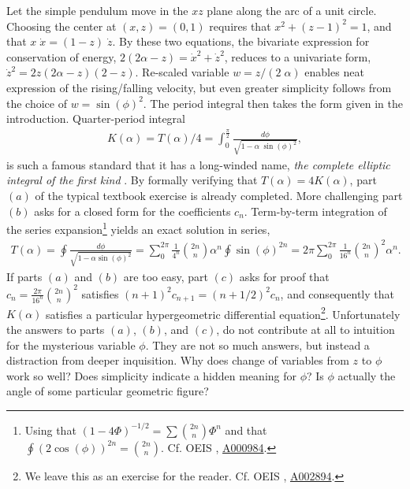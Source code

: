 \documentclass[nofootinbib,preprint]{revtex4-1}
\begin{document}
Let the simple pendulum move in the $xz$ plane along the arc of a unit circle. Choosing 
the center at $(x,z)=(0,1)$ requires that  $x^2+(z-1)^2=1$, and that $x\;\dot{x}=(1-z)\;\dot{z}$.
By these two equations, the bivariate expression for conservation of energy,
$2(2\alpha-z)=\dot{x}^2+\dot{z}^2$, reduces to a univariate form, $\dot{z}^2=2z(2\alpha-z)(2-z)$. 
Re-scaled variable 
$w=z/(2\;\alpha)$ enables neat expression of the rising/falling velocity, but even greater 
simplicity follows from the choice of $w=\sin(\phi)^2$. The period integral then takes 
the form given in the introduction. Quarter-period integral
\begin{eqnarray}
K(\alpha)=T(\alpha)/4=\int_{0}^{\frac{\pi}{2}} \frac{d\phi}{\sqrt{1-\alpha\;\sin(\phi)^2}}, 
\nonumber
\end{eqnarray}
is such a famous standard that it has a long-winded name, \textit{the complete elliptic 
integral of the first kind} \cite{LL1982}. By formally verifying that $T(\alpha)=4K(\alpha)$, 
part $(a)$ of the typical textbook exercise is already completed. More challenging part 
$(b)$ asks for a closed form for the coefficients $c_n$. Term-by-term integration of 
the series expansion\footnote{Using that $(1-4\Phi)^{-1/2} = \sum \binom{2n}{n}\Phi^n $ 
and that $\oint (2\cos(\phi))^{2n} = \binom{2n}{n}$. Cf. OEIS \cite{SLOANE2019},  
\href{https://oeis.org/A000984}{A000984}.} 
yields an exact solution in series,
\begin{eqnarray}
T(\alpha)= \oint \frac{d\phi}{\sqrt{1-\alpha \sin(\phi)^2}}
=\sum_{0}^{2\pi} \frac{1}{4^n}\binom{2n}{n} \alpha^n \oint\sin(\phi)^{2n}
= 2\pi \sum_{0}^{2\pi} \frac{1}{16^n}\binom{2n}{n}^2 \alpha^n. \nonumber 
\end{eqnarray}
If parts $(a)$ and $(b)$ are too easy, part $(c)$ asks for proof that 
$c_n=\frac{2\pi}{16^n}\binom{2n}{n}^2$ satisfies ${(n+1)^2 c_{n+1}=(n+1/2)^2c_n}$, and 
consequently that $K(\alpha)$ satisfies a particular hypergeometric differential 
equation\footnote{We leave this as an exercise for the reader. Cf. OEIS \cite{SLOANE2019}, 
\href{https://oeis.org/A002894}{A002894}.}. Unfortunately the 
answers to parts $(a)$, $(b)$, and $(c)$, do not contribute at all to intuition for 
the mysterious variable $\phi$. They are not so much answers, but instead a distraction
from deeper inquisition. Why does change of variables from $z$ to $\phi$ 
work so well? Does simplicity indicate a hidden meaning for $\phi$? Is $\phi$ actually
the angle of some particular geometric figure? 
\end{document}
